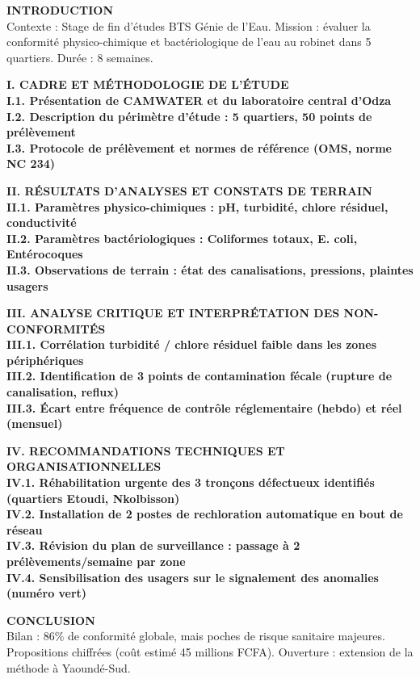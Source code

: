 \documentclass[11pt]{article}
\begin{document}
\begin{exoresolu}
\textbf{INTRODUCTION}\\
Contexte : Stage de fin d'études BTS Génie de l'Eau. Mission : évaluer la conformité physico-chimique et bactériologique de l'eau au robinet dans 5 quartiers. Durée : 8 semaines.
\medskip

\noindent\textbf{I. CADRE ET MÉTHODOLOGIE DE L'ÉTUDE}\\
\textbf{I.1. Présentation de CAMWATER et du laboratoire central d'Odza}\\
\textbf{I.2. Description du périmètre d'étude : 5 quartiers, 50 points de prélèvement}\\
\textbf{I.3. Protocole de prélèvement et normes de référence (OMS, norme NC 234)}
\medskip

\noindent\textbf{II. RÉSULTATS D'ANALYSES ET CONSTATS DE TERRAIN}\\
\textbf{II.1. Paramètres physico-chimiques : pH, turbidité, chlore résiduel, conductivité}\\
\textbf{II.2. Paramètres bactériologiques : Coliformes totaux, E. coli, Entérocoques}\\
\textbf{II.3. Observations de terrain : état des canalisations, pressions, plaintes usagers}
\medskip

\noindent\textbf{III. ANALYSE CRITIQUE ET INTERPRÉTATION DES NON-CONFORMITÉS}\\
\textbf{III.1. Corrélation turbidité / chlore résiduel faible dans les zones périphériques}\\
\textbf{III.2. Identification de 3 points de contamination fécale (rupture de canalisation, reflux)}\\
\textbf{III.3. Écart entre fréquence de contrôle réglementaire (hebdo) et réel (mensuel)}
\medskip

\noindent\textbf{IV. RECOMMANDATIONS TECHNIQUES ET ORGANISATIONNELLES}\\
\textbf{IV.1. Réhabilitation urgente des 3 tronçons défectueux identifiés (quartiers Etoudi, Nkolbisson)}\\
\textbf{IV.2. Installation de 2 postes de rechloration automatique en bout de réseau}\\
\textbf{IV.3. Révision du plan de surveillance : passage à 2 prélèvements/semaine par zone}\\
\textbf{IV.4. Sensibilisation des usagers sur le signalement des anomalies (numéro vert)}
\medskip

\noindent\textbf{CONCLUSION}\\
Bilan : 86\% de conformité globale, mais poches de risque sanitaire majeures. Propositions chiffrées (coût estimé 45 millions FCFA). Ouverture : extension de la méthode à Yaoundé-Sud.
\medskip


\end{exoresolu}
\end{document}
